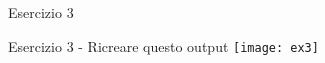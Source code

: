 \begin{frame}{Esercizio 3}

\begin{esercizio}{Esercizio 3 - Ricreare questo output}
\centering
 \texttt{[image: ex3]}
\end{esercizio}

\end{frame}